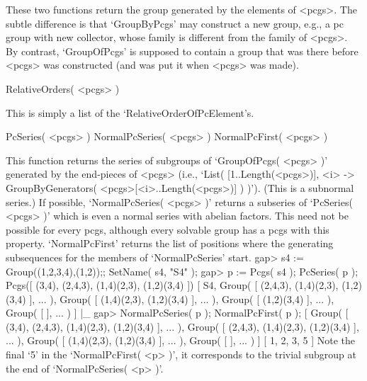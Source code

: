 %
These two functions return the group generated by the elements of <pcgs>.
The subtle difference is that  `GroupByPcgs' may  construct a new  group,
e.g., a pc group  with new collector, whose  family is different from the
family of <pcgs>.  By contrast,  `GroupOfPcgs'  is supposed to contain  a
group that was there before  <pcgs> was constructed  (and was put it when
<pcgs> was made).

\>RelativeOrders( <pcgs> )

This is simply a list of the `RelativeOrderOfPcElement's.

\>PcSeries( <pcgs> )
\>NormalPcSeries( <pcgs> )
\>NormalPcFirst( <pcgs> )

This function returns the series of subgroups  of `GroupOfPcgs( <pcgs> )'
generated by the end-pieces of  <pcgs> (i.e., `List( [1..Length(<pcgs>)],
<i> -> GroupByGenerators( <pcgs>{[<i>..Length(<pcgs>)]} ) )'). (This is a
subnormal  series.) If possible,  `NormalPcSeries(  <pcgs>  )' returns  a
subseries of `PcSeries(  <pcgs>  )' which  is  even a normal series  with
abelian factors. This need not be possible for every pcgs, although every
solvable group has a pcgs with this property. `NormalPcFirst' returns the
list of positions where the  generating  subsequences for the members  of
`NormalPcSeries' start.
\beginexample
    gap> s4 := Group((1,2,3,4),(1,2));;  SetName( s4, "S4" );
    gap> p := Pcgs( s4 );  PcSeries( p );
    Pcgs([ (3,4), (2,4,3), (1,4)(2,3), (1,2)(3,4) ])
    [ S4, Group( [ (2,4,3), (1,4)(2,3), (1,2)(3,4) ], ... ), 
      Group( [ (1,4)(2,3), (1,2)(3,4) ], ... ), 
      Group( [ (1,2)(3,4) ], ... ), Group( [  ], ... ) ]
|_
    gap> NormalPcSeries( p );  NormalPcFirst( p );
    [ Group( [ (3,4), (2,4,3), (1,4)(2,3), (1,2)(3,4) ], ... ), 
      Group( [ (2,4,3), (1,4)(2,3), (1,2)(3,4) ], ... ), 
      Group( [ (1,4)(2,3), (1,2)(3,4) ], ... ), Group( [  ], ... ) ]
    [ 1, 2, 3, 5 ]
\endexample
Note the final `5' in the  `NormalPcFirst( <p> )',  it corresponds to the
trivial subgroup at the end of `NormalPcSeries( <p> )'.

\null

